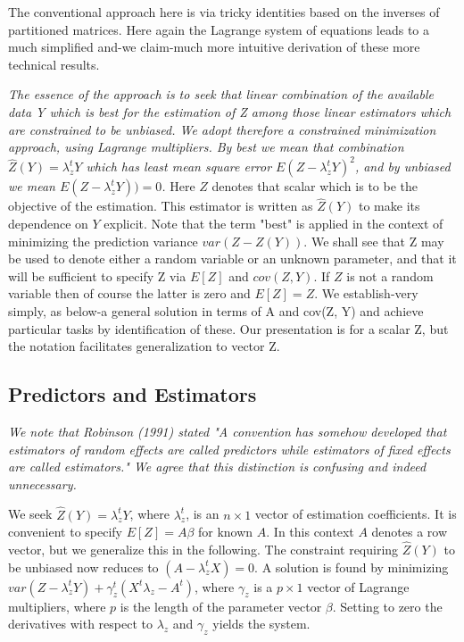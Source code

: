 \documentclass[12pt, a4paper]{article}
\begin{document}
The conventional approach here is via tricky identities based on the inverses of partitioned matrices. Here again the Lagrange system of equations leads to a much simplified and-we claim-much more intuitive derivation of these more technical results.


\emph{
The essence of the approach is to seek that linear combination of the available data Y which is best for the
estimation of Z among those linear estimators which are constrained to be unbiased. We adopt therefore a constrained minimization approach, using Lagrange multipliers. By best we mean that combination $\hat{Z}(Y) = \lambda_{z}^{t}Y$ which has least mean square error $E( Z- \lambda_{z}^{t}Y)^2$, and by unbiased we mean $E( Z- \lambda_{z}^{t}Y)) = 0$. }
Here $Z$ denotes that scalar which is to be the objective of the estimation. This estimator is written as $\hat{Z}(Y)$ to make its dependence on $Y$ explicit. Note that the term "best" is applied in the context of minimizing the prediction variance $var(Z - Z(Y))$. We shall see that Z may be used to denote either a random variable or an unknown parameter, and that it will be sufficient to specify Z via $E[Z]$ and $cov(Z, Y)$. If $Z$ is not a random variable then of course the latter is zero and $E[Z] = Z$. We establish-very simply, as below-a general solution in terms of A and cov(Z, Y) and achieve particular tasks by identification of these. Our presentation is for a scalar Z, but the notation facilitates generalization to vector Z.



\subsection{Predictors and Estimators}

\emph{We note that Robinson (1991) stated "A convention has somehow developed that estimators of random effects are called predictors while estimators of fixed effects are called estimators." We agree that this distinction is confusing and indeed unnecessary.} \\ \bigskip



We seek $\hat{Z}(Y) = \lambda_{z}^{t}Y$, where $ \lambda_{z}^{t}$, is an $n \times 1$ vector of estimation coefficients. It is convenient to specify $E[Z]=A\beta$ for known $A$. In this context $A$ denotes a row vector, but we generalize this in the following. The constraint requiring $\hat{Z}(Y)$ to be unbiased now reduces to $(A -  \lambda_{z}^{t}X) = 0$. A solution is found by minimizing $var(Z -  \lambda_{z}^{t}Y) + \gamma^t_z (X^t\lambda_{z} - A^t)$, where $\gamma_z$ is a $p \times 1$ vector of Lagrange multipliers, where $p$ is the length of the parameter vector $\beta$. Setting to zero the derivatives with respect to $\lambda_{z}$ and $\gamma_z $ yields the system.
\end{document}
